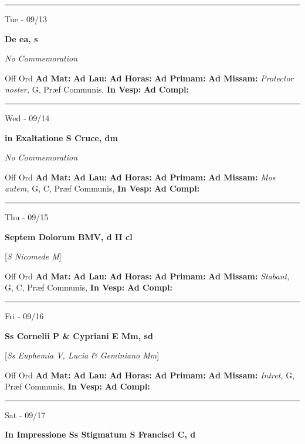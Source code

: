 \documentclass[letterpaper, 10pt]{article}
\begin{document}
\hrule
\begin{center}
Tue - 09/13
\end{center}\textbf{ \large De ea, \textnormal{\normalsize s}}

\textit{No Commemoration}\begin{justify}
Off Ord
\textbf{Ad Mat: }
\textbf{Ad Lau: }
\textbf{Ad Horas: }
\textbf{Ad Primam: }
\textbf{Ad Missam:} \textit{Protector noster, } G, Præf Communis, 
\textbf{In Vesp: }
\textbf{Ad Compl: }\end{justify}



\hrule
\begin{center}
Wed - 09/14
\end{center}\textbf{ \large in Exaltatione S Cruce, \textnormal{\normalsize dm}}

\textit{No Commemoration}\begin{justify}
Off Ord
\textbf{Ad Mat: }
\textbf{Ad Lau: }
\textbf{Ad Horas: }
\textbf{Ad Primam: }
\textbf{Ad Missam:} \textit{Mos autem, } G, C, Præf Communis, 
\textbf{In Vesp: }
\textbf{Ad Compl: }\end{justify}



\hrule
\begin{center}
Thu - 09/15
\end{center}\textbf{ \large Septem Dolorum BMV, \textnormal{\normalsize d II cl}}

[\textit{S Nicomede M}]
\begin{justify}
Off Ord
\textbf{Ad Mat: }
\textbf{Ad Lau: }
\textbf{Ad Horas: }
\textbf{Ad Primam: }
\textbf{Ad Missam:} \textit{Stabant, } G, C, Præf Communis, 
\textbf{In Vesp: }
\textbf{Ad Compl: }\end{justify}



\hrule
\begin{center}
Fri - 09/16
\end{center}\textbf{ \large Ss Cornelii P \& Cypriani E Mm, \textnormal{\normalsize sd}}

[\textit{Ss Euphemia V, Lucia \& Geminiano Mm}]
\begin{justify}
Off Ord
\textbf{Ad Mat: }
\textbf{Ad Lau: }
\textbf{Ad Horas: }
\textbf{Ad Primam: }
\textbf{Ad Missam:} \textit{Intret, } G, Præf Communis, 
\textbf{In Vesp: }
\textbf{Ad Compl: }\end{justify}



\hrule
\begin{center}
Sat - 09/17
\end{center}\textbf{ \large In Impressione Ss Stigmatum S Francisci C, \textnormal{\normalsize d}}
\end{document}
